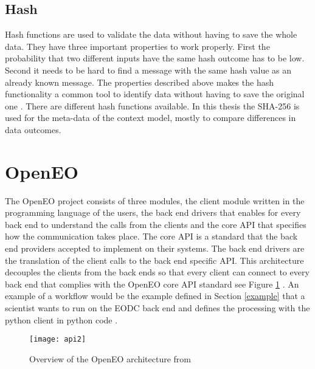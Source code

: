 \documentclass[draft,final]{vutinfth} %
\begin{document}
\subsection{Hash}\label{Hash}
Hash functions are used to validate the data without having to save the whole data. They have three important properties to work properly. First the probability that two different inputs have the same hash outcome has to be low. Second it needs to be hard to find a message with the same hash value as an already known message. The properties described above makes the hash functionality a common tool to identify data without having to save the original one \cite{3b412889270f46f59740fbf1ca8cd7e0}.  
There are different hash functions available. In this thesis the SHA-256 is used for the meta-data of the context model, mostly to compare differences in data outcomes.




\section{OpenEO}\label{OpenEO}
The OpenEO project consists of three modules, the client module written in the programming language of the users, the back end drivers that enables for every back end to understand the calls from the clients and the core API that specifies how the communication takes place. The core API is a standard that the back end providers accepted to implement on their systems. The back end drivers are the translation of the client calls to the back end specific API. This architecture decouples the clients from the back ends so that every client can connect to every back end that complies with the OpenEO core API standard see Figure \ref{fig:api2} . An example of a workflow would be the example defined in Section \ref{example} that a scientist wants to run on the EODC back end and defines the processing with the python client in python code \cite{openeo}.  

\begin{figure}[h]
	\centering
	\texttt{[image: api2]}
	\caption{Overview of the OpenEO architecture from \cite{openeo_github} }
	\label{fig:api2} %
\end{figure}
\end{document}
